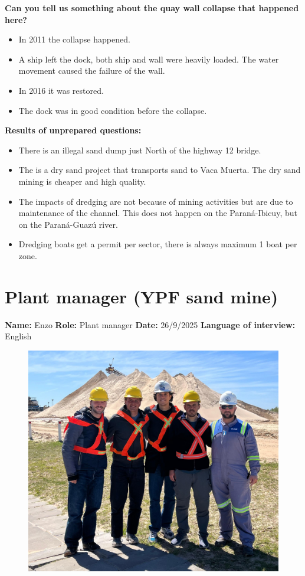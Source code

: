 \newpage
\textbf{Can you tell us something about the quay wall collapse that happened here?}
\begin{itemize}
    \item In 2011 the collapse happened.
    \item A ship left the dock, both ship and wall were heavily loaded. The water movement caused the failure of the wall.
    \item In 2016 it was restored.
    \item The dock was in good condition before the collapse.
\end{itemize}

\textbf{Results of unprepared questions:}
\begin{itemize}
    \item There is an illegal sand dump just North of the highway 12 bridge.
    \item The is a dry sand project that transports sand to Vaca Muerta. The dry sand mining is cheaper and high quality.
    \item The impacts of dredging are not because of mining activities but are due to maintenance of the channel. This does not happen on the Paraná-Ibicuy, but on the Paraná-Guazú river.
    \item Dredging boats get a permit per sector, there is always maximum 1 boat per zone.
\end{itemize}

\section{Plant manager (YPF sand mine)}
\textbf{Name:} Enzo \newline
\textbf{Role:} Plant manager \newline
\textbf{Date:} 26/9/2025 \newline
\textbf{Language of interview:} English

\begin{figure}[H]
    \centering
    \includegraphics[width=0.4\linewidth]{figures/appendixE/InterviewYPF.jpeg}
\end{figure}

